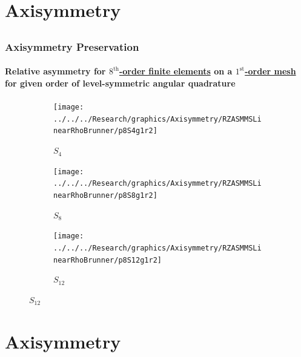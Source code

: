 \documentclass[compress,t]{beamer}
\begin{document}
\section{Axisymmetry}
\subsection{}

\begin{frame}
\frametitle{Axisymmetry Preservation}
\framesubtitle{Relative asymmetry for \underline{$8^\text{th}$-order finite elements} on a \underline{$1^\text{st}$-order mesh} for given order of level-symmetric angular quadrature}

\begin{figure}
\centering
\begin{subfigure}{0.33\textwidth}
\centering
\texttt{[image: ../../../Research/graphics/Axisymmetry/RZASMMSLinearRhoBrunner/p8S4g1r2]}
\caption{$S_4$}
\end{subfigure}%
\begin{subfigure}{0.33\textwidth}
\centering
\texttt{[image: ../../../Research/graphics/Axisymmetry/RZASMMSLinearRhoBrunner/p8S8g1r2]}
\caption{$S_8$}
\end{subfigure}%
\begin{subfigure}{0.33\textwidth}
\centering
\texttt{[image: ../../../Research/graphics/Axisymmetry/RZASMMSLinearRhoBrunner/p8S12g1r2]}
\caption{$S_{12}$}
\end{subfigure}
\end{figure}

\end{frame}

\section{Axisymmetry}
\subsection{}
\end{document}
